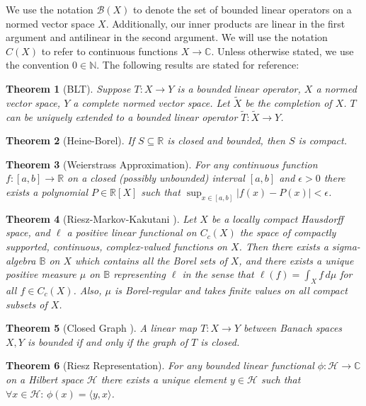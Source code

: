 \documentclass[12pt,oneside]{report}
\newtheorem{thm}{Theorem}[chapter]
\begin{document}
We use the notation $\mathscr{B}(X)$ to denote the set of bounded linear operators on a normed vector space $X$. Additionally, our inner products are linear in the first argument and antilinear in the second argument. We will use the notation $C(X)$ to refer to continuous functions $X \to \mathbb{C}$. Unless otherwise stated, we use the convention $0 \in \mathbb{N}$. The following results are stated for reference:

\begin{thm}[BLT]
    Suppose $T: X \to Y$ is a bounded linear operator, $X$ a normed vector space, $Y$ a complete normed vector space. Let $\tilde{X}$ be the completion of $X$. $T$ can be uniquely extended to a bounded linear operator $\tilde{T}: \tilde{X} \to Y$.
\end{thm}

\begin{thm}[Heine-Borel]
    If $S \subseteq \mathbb{R}$ is closed and bounded, then $S$ is compact.
\end{thm}

\begin{thm}[Weierstrass Approximation]
    For any continuous function $f: [a,b] \to \mathbb{R}$ on a closed (possibly unbounded) interval $[a,b]$ and $\epsilon > 0$ there exists a polynomial $P \in \mathbb{R}[X]$ such that $\sup_{x \in [a,b]}|f(x) - P(x)| < \epsilon$.
\end{thm}

\begin{thm}[Riesz-Markov-Kakutani \cite{rudin_real_2013}]
    Let $X$ be a locally compact Hausdorff space, and $\ell$ a positive linear functional on $C_{c}(X)$ the space of compactly supported, continuous, complex-valued functions on $X$. Then there exists a sigma-algebra $\mathbb{B}$ on $X$ which contains all the Borel sets of $X$, and there exists a unique positive measure $\mu$ on $\mathbb{B}$ representing $\ell$ in the sense that $\ell(f) = \int_X f \, d\mu$ for all $f \in C_{c}(X)$. Also, $\mu$ is Borel-regular and takes finite values on all compact subsets of $X$.
\end{thm}

\begin{thm}[Closed Graph \cite{Reed_Simon_1980}]
    A linear map $T: X \to Y$ between Banach spaces $X,Y$ is bounded if and only if the graph of $T$ is closed.
\end{thm}

\begin{thm}[Riesz Representation]
    For any bounded linear functional $\phi: \mathscr{H} \to \mathbb{C}$ on a Hilbert space $\mathscr{H}$ there exists a unique element $y \in \mathscr{H}$ such that $\forall x \in \mathscr{H}: \,\phi(x) = \langle y, x \rangle$.
\end{thm}
\end{document}
